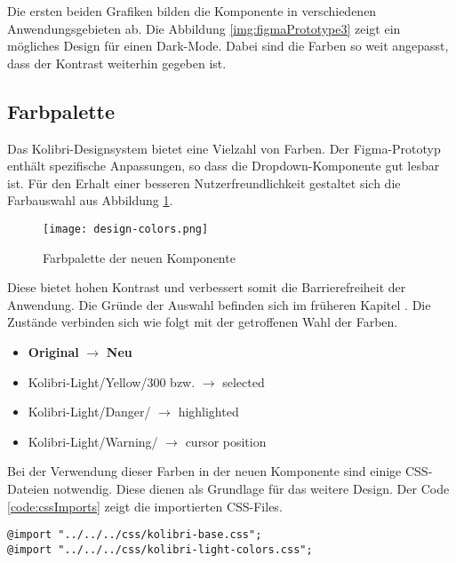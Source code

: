 Die ersten beiden Grafiken bilden die Komponente in verschiedenen Anwendungsgebieten ab. 
Die Abbildung \ref{img:figmaPrototype3} zeigt ein mögliches Design für einen Dark-Mode. 
Dabei sind die Farben so weit angepasst, dass der Kontrast weiterhin gegeben ist. 


\subsection{Farbpalette}
\label{sec:colorContrast}

Das Kolibri-Designsystem bietet eine Vielzahl von Farben. 
Der Figma-Prototyp enthält spezifische Anpassungen, so dass die Dropdown-Komponente gut lesbar ist. 
Für den Erhalt einer besseren Nutzerfreundlichkeit gestaltet sich die Farbauswahl aus Abbildung \ref{img:designColors}. 

\begin{figure}[!htb]
    \centering
    \texttt{[image: design-colors.png]}
    \caption{\centering Farbpalette der neuen Komponente}
    \label{img:designColors}
\end{figure}

Diese bietet hohen Kontrast und verbessert somit die Barrierefreiheit der Anwendung. 
Die Gründe der Auswahl befinden sich im früheren Kapitel \textbf{}. 
Die Zustände verbinden sich wie folgt mit der getroffenen Wahl der Farben. 

\begin{itemize}
    \item \textbf{Original} $\rightarrow$ \textbf{Neu}
    \item Kolibri-Light/Yellow/300 bzw.  $\rightarrow$ selected
    \item Kolibri-Light/Danger/ $\rightarrow$ highlighted
    \item Kolibri-Light/Warning/ $\rightarrow$ cursor position
\end{itemize}

Bei der Verwendung dieser Farben in der neuen Komponente sind einige CSS-Dateien notwendig. 
Diese dienen als Grundlage für das weitere Design. 
Der Code \ref{code:cssImports} zeigt die importierten CSS-Files. 

\begin{lstlisting}[style = htmlcssjs, caption = Notwendige CSS-Imports, label = code:cssImports]
@import "../../../css/kolibri-base.css";
@import "../../../css/kolibri-light-colors.css";
\end{lstlisting}

